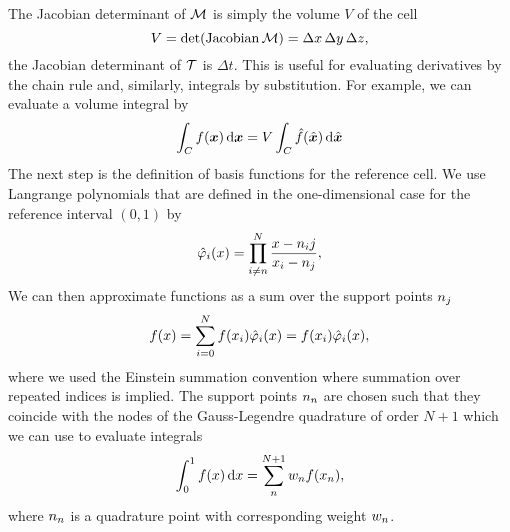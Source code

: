 The Jacobian determinant of $\mapping$ is simply the volume $V$ of the cell
\begin{equation}
  \label{eq:determinant-mapping}
  \volume = \operatorname{det}(\operatorname{Jacobian}\mapping) = \Delta x \, \Delta y \,\Delta z,
\end{equation}
the Jacobian determinant of $\timeMapping$ is $\Delta t$.
This is useful for evaluating derivatives by the chain rule and, similarly, integrals by substitution.
For example, we can evaluate a volume integral by
\begin{equation}
  \label{eq:integration-by-substitution}
  \intdcell{
f(\bm{x})
  }
  =
\volume \intdrefcell{
    \hat{f}(\hat{\bm{x}})
  }
\end{equation}
The next step is the definition of basis functions for the reference cell.
We use Langrange polynomials that are defined in the one-dimensional case for the reference interval $(0,1)$ by
\begin{align}
  \label{eq:lagrange-basis}
    \lagrangeRef(x) = \prod_{i \neq n}^N \frac{x - {\quadNode{j}}}{x_i - \quadNode[j]},
\end{align}
We can then approximate functions as a sum over the support points $\quadNode[j]$
\begin{equation}
  \label{eq:langrange-expansion-1d}
  f(x) = \sum_{i = 0}^N f(x_i) \lagrangeRef[i](x) = f(x_i) \lagrangeRef[i](x),
\end{equation}
where we used the Einstein summation convention where summation over repeated indices is implied.
The support points $\quadNode[n]$ are chosen such that they coincide with the nodes of the Gauss-Legendre quadrature of order $N+1$ which we can use to evaluate integrals
\begin{equation}
  \label{eq:quadrature-1d}
  \int_0^1 f(x) \dd{x} = \sum_n^{N+1} \quadWeight[n] f(x_n),
\end{equation}
where $\quadNode[n]$ is a quadrature point with corresponding weight $\quadWeight[n]$.

